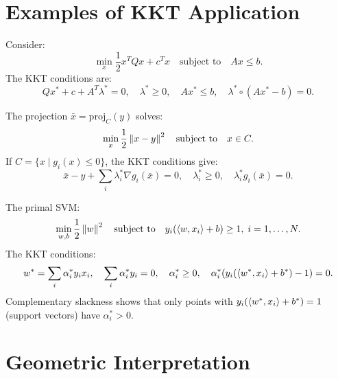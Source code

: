 \section{Examples of KKT Application}

\begin{example}
Consider:
\[
    \min_x \frac{1}{2}x^TQx + c^Tx \quad \text{subject to} \quad Ax \leq b.
\]
The KKT conditions are:
\[
    Qx^* + c + A^T\lambda^* = 0, \quad \lambda^* \geq 0, \quad
    Ax^* \leq b, \quad \lambda^* \circ (Ax^* - b) = 0.
\]
\end{example}

\begin{example}
The projection $\bar{x} = \mathrm{proj}_C(y)$ solves:
\[
    \min_x \frac{1}{2}\left\| x - y \right\|^2 \quad \text{subject to} \quad x \in C.
\]
If $C = \{x \mid g_i(x) \leq 0\}$, the KKT conditions give:
\[
    \bar{x} - y + \sum_i \lambda_i^* \nabla g_i(\bar{x}) = 0, \quad
    \lambda_i^* \geq 0, \quad \lambda_i^* g_i(\bar{x}) = 0.
\]
\end{example}

\begin{example}
The primal SVM:
\[
    \min_{w,b} \frac{1}{2}\left\| w \right\|^2 \quad \text{subject to} \quad
    y_i(\langle w, x_i \rangle + b) \geq 1, \; i=1,\ldots,N.
\]
The KKT conditions:
\[
    w^* = \sum_i \alpha_i^* y_i x_i, \quad
    \sum_i \alpha_i^* y_i = 0, \quad
    \alpha_i^* \geq 0, \quad
    \alpha_i^*(y_i(\langle w^*, x_i \rangle + b^*) - 1) = 0.
\]
Complementary slackness shows that only points with
$y_i(\langle w^*, x_i \rangle + b^*) = 1$ (support vectors) have $\alpha_i^* > 0$.
\end{example}

\section{Geometric Interpretation}

\begin{center}
\end{center}

